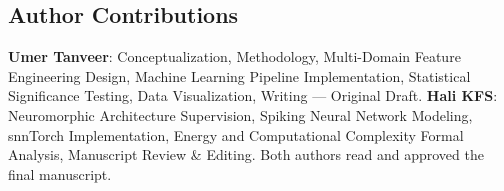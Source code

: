 \documentclass[pdflatex,sn-mathphys-num]{sn-jnl}
\begin{document}
\subsection*{Author Contributions}
\textbf{Umer Tanveer}: Conceptualization, Methodology, Multi-Domain Feature Engineering Design, Machine Learning Pipeline Implementation, Statistical Significance Testing, Data Visualization, Writing --- Original Draft.  
\textbf{Hali KFS}: Neuromorphic Architecture Supervision, Spiking Neural Network Modeling, snnTorch Implementation, Energy and Computational Complexity Formal Analysis, Manuscript Review \& Editing.  
Both authors read and approved the final manuscript.


\end{document}
